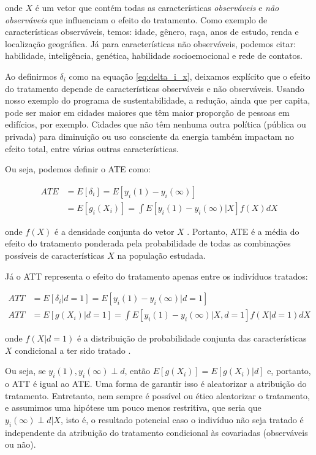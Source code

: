 \documentclass[portugues]{article}
\begin{document}
\noindent onde $X$ é um vetor que contém todas as características  \textit{observáveis} e \textit{não observáveis} que influenciam o efeito do tratamento. Como exemplo de características observáveis, temos: idade, gênero, raça, anos de estudo, renda e localização geográfica. Já para características não observáveis, podemos citar: habilidade, inteligência, genética, habilidade socioemocional e rede de contatos.

Ao definirmos $\delta_i$ como na equação \eqref{eq:delta_i_x}, deixamos explícito que o efeito do tratamento depende de características observáveis e não observáveis. Usando nosso exemplo do programa de sustentabilidade, a redução, ainda que per capita, pode ser maior em cidades maiores que têm maior proporção de pessoas em edifícios, por exemplo. Cidades que não têm nenhuma outra política (pública ou privada) para diminuição ou uso consciente da energia também impactam no efeito total, entre várias outras características.

Ou seja, podemos definir o ATE como:

\[
\begin{split}
    ATE & = E[\delta_i] = E[y_i(1) - y_i(\infty)] \\
        & = E[g_i(X_i)] = \int E[y_i(1) - y_i(\infty)|X] f(X) dX
\end{split}
\]

\noindent onde $f(X)$ é a densidade conjunta do vetor $X$ \citep{macurdy2011flexible}. Portanto, ATE é a média do efeito do tratamento ponderada pela probabilidade de todas as combinações possíveis de características $X$ na população estudada. 

Já o ATT representa o efeito do tratamento apenas entre os indivíduos tratados:

\[
\begin{split}
    ATT &= E[\delta_i|d=1] = E[y_i(1) - y_i(\infty)|d=1] \\
    ATT &= E[g(X_i) | d=1] = \int E[y_i(1) - y_i(\infty)|X, d=1] f(X|d=1) dX
\end{split}
\]

\noindent onde $f(X|d=1)$ é a distribuição de probabilidade conjunta das características $X$ condicional a ter sido tratado \cite{macurdy2011flexible}.

Ou seja, se $y_i(1), y_i(\infty) \perp d$, então $E[g(X_i)] = E[g(X_i) | d]$ e, portanto, o ATT é igual ao ATE. Uma forma de garantir isso é aleatorizar a atribuição do tratamento. Entretanto, nem sempre é possível ou ético aleatorizar o tratamento, e assumimos uma hipótese um pouco menos restritiva, que seria que $y_i(\infty) \perp d | X$, isto é, o resultado potencial caso o indivíduo não seja tratado é independente da atribuição do tratamento condicional às covariadas (observáveis ou não).
\end{document}
